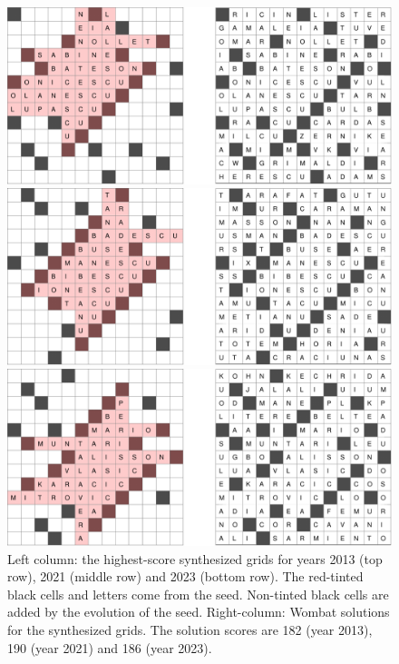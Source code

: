 \begin{figure}[t]
\centering
\includegraphics[width=\columnwidth]{_empiricalSupport/y-2013/results/_runWombat/mrmeGrids_y2013-60x932-14400x352-14113466-paper.pdf}

\vspace{0.5cm}

\includegraphics[width=\columnwidth]{_empiricalSupport/y-2021/results/_runWombat/mrmeGrids_feb3-60x38035-14400x224-13741779-paper.pdf}

\vspace{0.5cm}

\includegraphics[width=\columnwidth]{_empiricalSupport/y-2023/results/_runWombat/mrmeGrids_y2023-60x446-14400x352-14179462-paper.pdf}

\caption{Left column: the highest-score synthesized grids for years 2013 (top row), 2021 (middle row) and 2023 (bottom row). The red-tinted black cells and letters come from the seed. Non-tinted black cells are added by the evolution of the seed. Right-column: {\sc Wombat} solutions for the synthesized grids. The solution scores are 182 (year 2013), 190 (year 2021) and 186 (year 2023).}
\label{fig:results}
\end{figure}